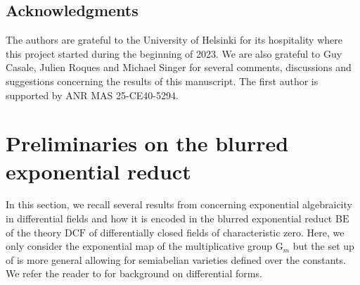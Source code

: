 \documentclass[12pt]{amsart}
\newcommand{\DCF}{\mathrm{DCF}}
\theoremstyle{definition}
\theoremstyle{plain}
\newtheorem{ques}[defn]{Question}
\theoremstyle{exampstyle}\newtheorem{thmx}{Theorem}
\theoremstyle{exampstyle}\newtheorem{thmxbis}{Theorem}
\begin{document}
%
%
%
%



\subsection*{Acknowledgments} The authors are grateful to the University of Helsinki for its hospitality where this project started during the beginning of 2023. We are also grateful to Guy Casale, Julien Roques and Michael Singer for several comments, discussions and suggestions concerning the results of this manuscript. The first author is supported by ANR MAS 25-CE40-5294.
\section{Preliminaries on the blurred exponential reduct} 

In this section, we recall several results from \cite{Kirby-semiab} concerning exponential algebraicity in differential fields and how it is encoded in the blurred exponential reduct $\mathrm{BE}$ of the theory $\mathrm{DCF}$ of differentially closed fields of characteristic zero. Here, we only consider the exponential map of the multiplicative group $\mathrm{G}_m$ but the set up of \cite{Kirby-semiab} is more general  allowing for semiabelian varieties defined over the constants.  We refer the reader to \cite{Rosenlicht} for background on differential forms. 
\end{document}
